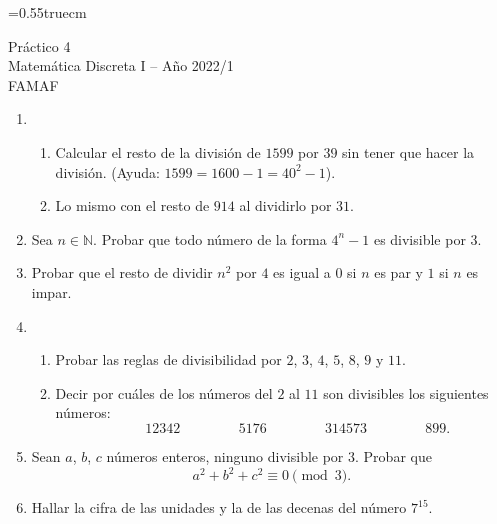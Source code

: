 \documentclass[a4paper,12pt,twoside,spanish,reqno]{amsbook}
\numberwithin{equation}{section}
\begin{document}
    \baselineskip=0.55truecm %
    


{\bf \begin{center}\large Práctico 4 \\ Matemática Discreta I -- Año 2022/1 \\ FAMAF \end{center}}



\begin{enumerate}
\setlength\itemsep{1.1em}

\item  
    \begin{enumerate}
        \item Calcular el resto de la división de $1599$ por $39$ sin tener que hacer la división. (Ayuda: $1599=1600-1=40^2-1$).
        \item Lo mismo con el resto de $914$ al dividirlo por $31$.
    \end{enumerate}


\item Sea $n\in\mathbb N$. Probar que todo número de la forma $4^n-1$ es divisible por $3$.


\item Probar que el resto de dividir $n^2$ por $4$ es igual a $0$ si $n$ es par y $1$ si $n$ es impar.


\item
    \begin{enumerate}
    \item Probar las reglas de divisibilidad por $2$, $3$, $4$, $5$, $8$, $9$ y $11$.
    \item Decir por cuáles de los números del $2$ al $11$ son divisibles los siguientes números:
    \begin{equation*}
            \qquad 12342  \, \qquad   \qquad  5176 \, \qquad \qquad  314573\,  \qquad  \qquad  899.
        \end{equation*}
    \end{enumerate}


\item Sean $a$, $b$, $c$ números enteros, ninguno divisible por $3$. Probar que 
    \begin{equation*}
        a^2 + b^2 + c^2\equiv 0 \pmod 3.
    \end{equation*}


\item Hallar la cifra de las unidades y la de las decenas del número $7^{15}$.



\end{enumerate}
\end{document}
